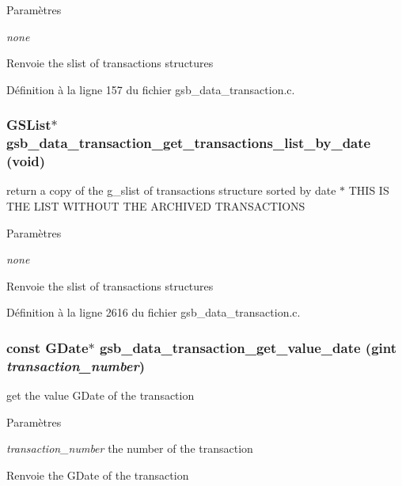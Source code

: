 \begin{DoxyParams}{Paramètres}
\item[{\em none}]\end{DoxyParams}
\begin{DoxyReturn}{Renvoie}
the slist of transactions structures 
\end{DoxyReturn}


Définition à la ligne 157 du fichier gsb\_\-data\_\-transaction.c.

\subsubsection[{gsb\_\-data\_\-transaction\_\-get\_\-transactions\_\-list\_\-by\_\-date}]{\setlength{\rightskip}{0pt plus 5cm}GSList$\ast$ gsb\_\-data\_\-transaction\_\-get\_\-transactions\_\-list\_\-by\_\-date (void)}\label{gsb__data__transaction_8h_ad256f5a749101f04cc270ce095eb9664}
return a copy of the g\_\-slist of transactions structure sorted by date $\ast$ THIS IS THE LIST WITHOUT THE ARCHIVED TRANSACTIONS


\begin{DoxyParams}{Paramètres}
\item[{\em none}]\end{DoxyParams}
\begin{DoxyReturn}{Renvoie}
the slist of transactions structures 
\end{DoxyReturn}


Définition à la ligne 2616 du fichier gsb\_\-data\_\-transaction.c.

\subsubsection[{gsb\_\-data\_\-transaction\_\-get\_\-value\_\-date}]{\setlength{\rightskip}{0pt plus 5cm}const GDate$\ast$ gsb\_\-data\_\-transaction\_\-get\_\-value\_\-date (gint {\em transaction\_\-number})}\label{gsb__data__transaction_8h_a5851b4114a8f23b40107fba99ae2fbef}
get the value GDate of the transaction 
\begin{DoxyParams}{Paramètres}
\item[{\em transaction\_\-number}]the number of the transaction \end{DoxyParams}
\begin{DoxyReturn}{Renvoie}
the GDate of the transaction 
\end{DoxyReturn}


